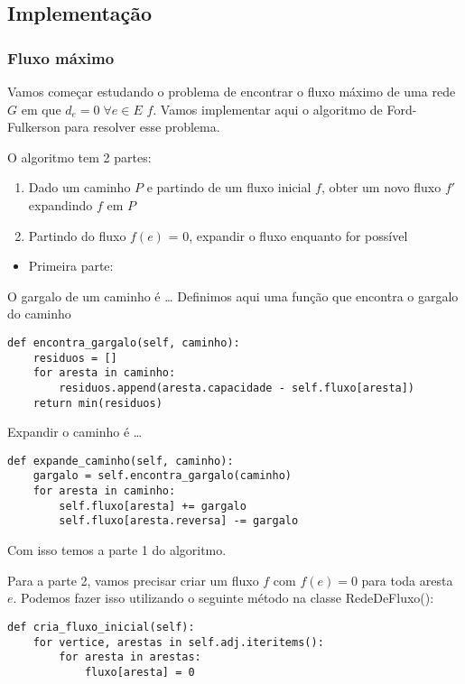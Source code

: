 \documentclass[11pt]{article}
\begin{document}
\subsection{Implementação}
\label{sec-3-3}

\subsubsection{Fluxo máximo}
\label{sec-3-3-1}

Vamos começar estudando o problema de encontrar o fluxo máximo de uma
rede $G$ em que $d_e = 0 \; \forall e \in E$ $f$. Vamos implementar aqui o
algoritmo de Ford-Fulkerson para resolver esse problema.

O algoritmo tem 2 partes:

\begin{enumerate}
\item Dado um caminho $P$ e partindo de um fluxo inicial $f$, obter um
novo fluxo $f'$ expandindo $f$ em $P$
\item Partindo do fluxo $f(e)$ = 0, expandir o fluxo enquanto for possível
\end{enumerate}


\begin{itemize}
\item Primeira parte:
\end{itemize}

O gargalo de um caminho é \ldots{}
Definimos aqui uma função que encontra o gargalo do caminho
\begin{verbatim}
def encontra_gargalo(self, caminho):
    residuos = []
    for aresta in caminho:
        residuos.append(aresta.capacidade - self.fluxo[aresta])
    return min(residuos)
\end{verbatim}

Expandir o caminho é \ldots{}

\begin{verbatim}
def expande_caminho(self, caminho):
    gargalo = self.encontra_gargalo(caminho)
    for aresta in caminho:
        self.fluxo[aresta] += gargalo
        self.fluxo[aresta.reversa] -= gargalo
\end{verbatim}

Com isso temos a parte 1 do algoritmo.

Para a parte 2, vamos precisar criar um fluxo $f$ com $f(e) = 0$ para
toda aresta $e$. Podemos fazer isso utilizando o seguinte método na
classe RedeDeFluxo():
\begin{verbatim}
def cria_fluxo_inicial(self):
    for vertice, arestas in self.adj.iteritems():
        for aresta in arestas:
            fluxo[aresta] = 0
\end{verbatim}
\end{document}
